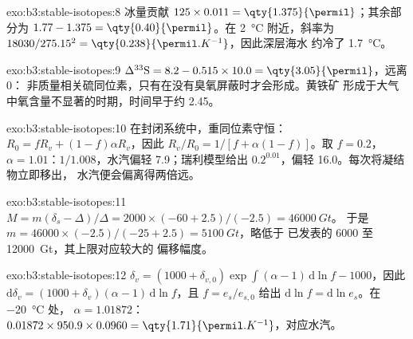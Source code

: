 \begin{solution}{exo:b3:stable-isotopes:8}
冰量贡献 $125\times0.011 = \qty{1.375}{\permil}$；其余部分为 $1.77 - 1.375 =
\qty{0.40}{\permil}$。在 \qty{2}{\celsius} 附近，斜率为 $18030/275.15^2 =
\qty{0.238}{\permil.K^{-1}}$，因此深层海水
约冷了 \qty{1.7}{\celsius}。
\end{solution}

\begin{solution}{exo:b3:stable-isotopes:9}
$\Delta^{33}\mathrm S = 8.2 - 0.515\times10.0 = \qty{3.05}{\permil}$，远离 0：
非质量相关硫同位素，只有在没有臭氧屏蔽时才会形成。黄铁矿
形成于大气中氧含量不显著的时期，时间早于约
\qty{2.45}{\Ga}。
\end{solution}

\begin{solution}{exo:b3:stable-isotopes:10}
在封闭系统中，重同位素守恒：$R_0 = fR_v + (1 -
f)\alpha R_v$，因此 $R_v/R_0 = 1/[f + \alpha(1 - f)]$。取 $f = 0.2$，$\alpha =
1.01$：$1/1.008$，水汽偏轻 \qty{7.9}{\permil}；瑞利模型给出
$0.2^{0.01}$，偏轻 \qty{16.0}{\permil}。每次将凝结物立即移出，
水汽便会偏离得两倍远。
\end{solution}

\begin{solution}{exo:b3:stable-isotopes:11}
$M = m(\delta_s - \Delta)/\Delta = 2000\times(-60 + 2.5)/(-2.5) = \qty{46000}{Gt}$。
于是 $m = 46000\times(-2.5)/(-25 + 2.5) = \qty{5100}{Gt}$，略低于
已发表的 6000 至 \qty{12000}{Gt}，其上限对应较大的
偏移幅度。
\end{solution}

\begin{solution}{exo:b3:stable-isotopes:12}
$\delta_v = (1000 + \delta_{v,0})\exp\int(\alpha - 1)\,\mathrm d\ln f - 1000$，因此
$\mathrm d\delta_v = (1000 + \delta_v)(\alpha - 1)\,\mathrm d\ln f$，且 $f =
e_s/e_{s,0}$ 给出 $\mathrm d\ln f = \mathrm d\ln e_s$。在 \qty{-20}{\celsius} 处，
$\alpha = 1.01872$：$0.01872\times950.9\times0.0960 =
\qty{1.71}{\permil.K^{-1}}$，对应水汽。
\end{solution}

